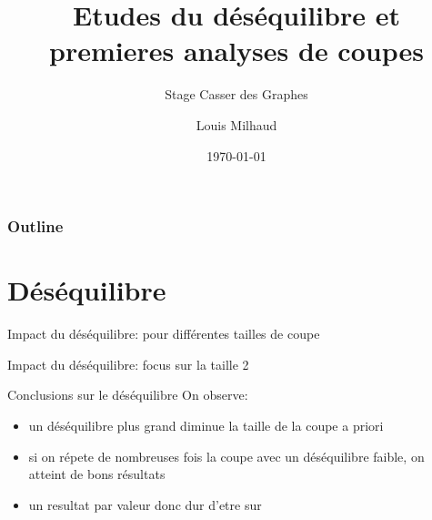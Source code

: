 \documentclass[aspectratio=169]{beamer}
\title{Etudes du déséquilibre et premieres analyses de coupes}
\subtitle{Stage Casser des Graphes}
\author{Louis Milhaud}
\institute{Complex Networks - LIP6}
\date{\today}
\begin{document}
    \begin{frame}
        \titlepage
    \end{frame}

    \begin{frame}
        \frametitle{Outline}
        \tableofcontents
    \end{frame}

    \section{Déséquilibre}
    
    \begin{frame}{Impact du déséquilibre: pour différentes tailles de coupe}
        \begin{center}
            
            
        \end{center}
        \begin{center}
            
        \end{center}
    \end{frame}

    \begin{frame}{Impact du déséquilibre: focus sur la taille 2}
       \begin{center}
           
       \end{center}
    \end{frame}

    \begin{frame}{Conclusions sur le déséquilibre}
        On observe:
        \begin{itemize}
            \item un déséquilibre plus grand diminue la taille de la coupe a priori
            \item si on répete de nombreuses fois la coupe avec un déséquilibre faible, on atteint de bons résultats
            \item un resultat par valeur donc dur d'etre sur
        \end{itemize}
    \end{frame}
\end{document}
